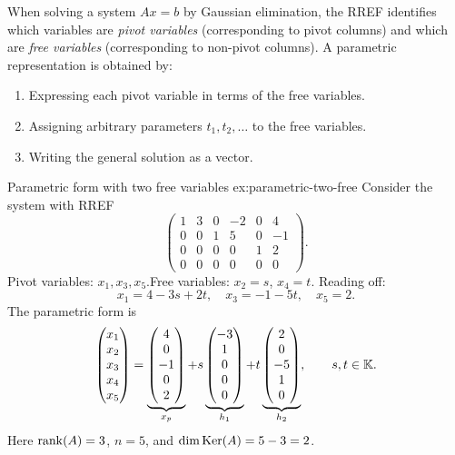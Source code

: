 When solving a system $Ax = b$ by Gaussian elimination, the RREF
identifies which variables are \emph{pivot variables}
(corresponding to pivot columns) and which are \emph{free variables}%
 (corresponding to non-pivot columns). A
parametric representation is obtained by:
\begin{enumerate}
  \item Expressing each pivot variable in terms of the free variables.
  \item Assigning arbitrary parameters $t_1, t_2, \dots$ to the free
    variables.
  \item Writing the general solution as a vector.
\end{enumerate}

\begin{example}{Parametric form with two free variables}%
{ex:parametric-two-free}
Consider the system with RREF
\[
  \left(\begin{array}{ccccc|c}
    1 & 3 & 0 & -2 & 0 & 4\\
    0 & 0 & 1 & 5 & 0 & -1\\
    0 & 0 & 0 & 0 & 1 & 2\\
    0 & 0 & 0 & 0 & 0 & 0
  \end{array}\right).
\]
Pivot variables: $x_1, x_3, x_5$.\quad Free variables: $x_2 = s$,
$x_4 = t$. Reading off:
\[
  x_1 = 4 - 3s + 2t, \quad x_3 = -1 - 5t, \quad x_5 = 2.
\]
The parametric form is
\[
  \begin{pmatrix} x_1\\ x_2\\ x_3\\ x_4\\ x_5 \end{pmatrix}
  =
  \underbrace{\begin{pmatrix} 4\\ 0\\ -1\\ 0\\ 2 \end{pmatrix}}_{x_p}
  + s\underbrace{\begin{pmatrix} -3\\ 1\\ 0\\ 0\\ 0 \end{pmatrix}}_{h_1}
  + t\underbrace{\begin{pmatrix} 2\\ 0\\ -5\\ 1\\ 0 \end{pmatrix}}_{h_2},
  \qquad s,t\in{\mathbb{K}}.
\]
Here $\operatorname{rank}(A) = 3$, $n = 5$, and $\dim\operatorname{Ker}(A) = 5 - 3 = 2$.
\end{example}


